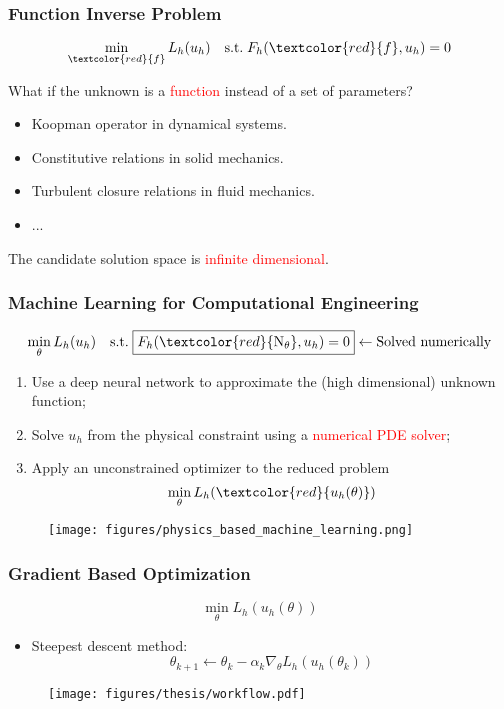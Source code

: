 \documentclass[usenames,dvipsnames]{beamer}
\begin{document}
\begin{frame}
	\frametitle{Function Inverse Problem}
	
	\begin{equation*}
		\min_{\textcolor{red}{f}} L_h(u_h) \quad \mathrm{s.t.}\; F_h(\textcolor{red}{f}, u_h) = 0
	\end{equation*}
	
	What if the unknown is a \textcolor{red}{function} instead of a set of parameters?
\begin{itemize}
	\item Koopman operator in dynamical systems.
	\item Constitutive relations in solid mechanics. 
	\item Turbulent closure relations in fluid mechanics.
	\item ...
\end{itemize}

The candidate solution space is \textcolor{red}{infinite dimensional}.

\end{frame}





\begin{frame}
	\frametitle{Machine Learning for Computational Engineering}
	$$\min_{\theta} L_h(u_h) \quad \mathrm{s.t.}\;\boxed{F_h(\textcolor{red}{\text{N}_\theta}, u_h) = 0} \leftarrow \mbox{Solved numerically}$$
	\vspace{-0.5cm}
	\begin{enumerate}
		\item Use a deep neural network to approximate the (high dimensional) unknown function;
		\item Solve $u_h$ from the physical constraint using a \textcolor{red}{numerical PDE solver};
		\item Apply an unconstrained optimizer to the reduced problem
		$$\min_{\theta} L_h(\textcolor{red}{u_h(\theta)})$$
	\end{enumerate}
	\vspace{-0.3cm}
	\begin{figure}[hbt]
		\texttt{[image: figures/physics\_based\_machine\_learning.png]}
	\end{figure}
\end{frame}



\begin{frame}
	\frametitle{Gradient Based Optimization}
		$$\min_{\theta} L_h({u_h(\theta)})$$
	
	\begin{itemize}
		\item Steepest descent method:
		$$\theta_{k+1} \gets \theta_k - \alpha_k \nabla_\theta L_h(u_h(\theta_k))$$ 
	\end{itemize}
	
	\begin{figure}[hbt]
	\centering
  \texttt{[image: figures/thesis/workflow.pdf]}
\end{figure}

\end{frame}
\end{document}
